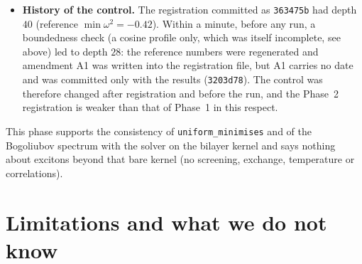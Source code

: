 \documentclass[11pt,a4paper]{article}
\begin{document}
\begin{itemize}[nosep]
$\tfrac12\bar n^2F(w)$ with $\min_wF=-19$; script ), so no minimiser exists (the
uniform state is an unstable stationary point); in this family a bounded, linearly unstable control does not exist at fixed $\mu$. The
failure therefore says nothing against the solver or the Lean statement, but the gate stays failed.
\item \textbf{History of the control.} The registration committed as \texttt{363475b} had depth $40$ (reference $\min\omega^2=-0.42$). Within a
minute, before any run, a boundedness check (a cosine profile only, which was itself incomplete, see above) led to depth $28$: the
reference numbers were regenerated and amendment A1 was written into the registration file, but A1 carries no date and was
committed only with the results (\texttt{3203d78}). The control was therefore changed after registration and before the run, and the
Phase~2 registration is weaker than that of Phase~1 in this respect.
\end{itemize}
This phase supports the consistency of \texttt{uniform\_minimises} and of the Bogoliubov spectrum with the solver on the bilayer
kernel and says nothing about excitons beyond that bare kernel (no screening, exchange, temperature or correlations).

\section{Limitations and what we do not know}
\end{document}
